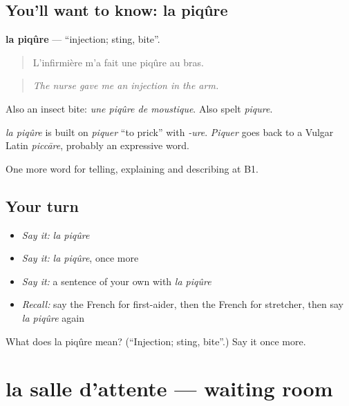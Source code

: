 \subsection*{You'll want to know: la piqûre}
\textbf{la piqûre} — \textquotedblleft{}injection; sting, bite\textquotedblright{}.

\begin{quote}
L'infirmière m'a fait une piqûre au bras.
\end{quote}

\begin{quote}
\emph{The nurse gave me an injection in the arm.}
\end{quote}

Also an insect bite: \emph{une piqûre de moustique}. Also spelt \emph{piqure}.

\begin{cousinweb}
\emph{la piqûre} is built on \emph{piquer} \textquotedblleft{}to prick\textquotedblright{} with \emph{-ure}. \emph{Piquer} goes back to a Vulgar Latin \emph{piccāre}, probably an expressive word.
\end{cousinweb}

\begin{grammarlens}[title={What you've built}]
One more word for telling, explaining and describing at B1.
\end{grammarlens}

\subsection*{Your turn}
\begin{itemize}
\raggedright
  \item \emph{Say it:} \emph{la piqûre}
  \item \emph{Say it:} \emph{la piqûre}, once more
  \item \emph{Say it:} a sentence of your own with \emph{la piqûre}
  \item \emph{Recall:} say the French for first-aider, then the French for stretcher, then say \emph{la piqûre} again
\end{itemize}

\begin{tcolorbox}[breakable,colback=teal!4,colframe=teal!35!black,title={Before you move on}]
What does la piqûre mean? (\textquotedblleft{}Injection; sting, bite\textquotedblright{}.) Say it once more.
\end{tcolorbox}
\section[la salle d'attente]{la salle d'attente — waiting room}

